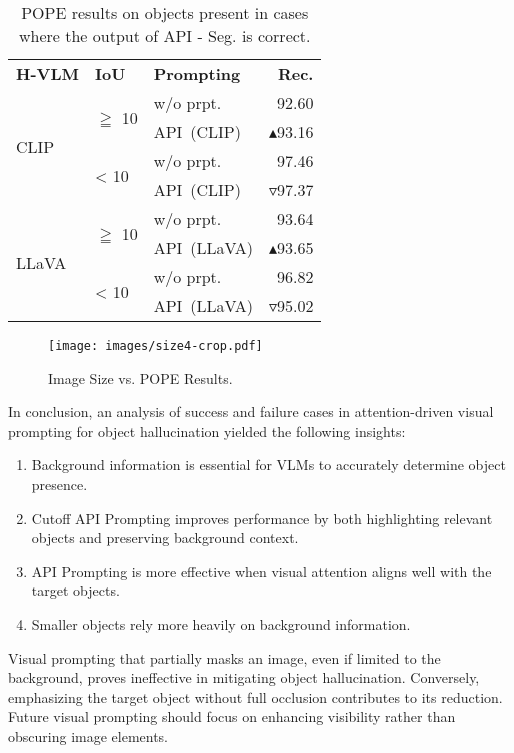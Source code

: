 \begin{table}[t!]
\centering
\begin{tabular}{lllr}
\toprule
\textbf{H-VLM} & \textbf{IoU} & \textbf{Prompting} & \textbf{Rec.} \\ \cmidrule(lr){1-4}
\multirow{4}{*}{CLIP} &\multirow{2}{*}{$\geqq$ 10} & w/o prpt. & 92.60\\
&& API~(CLIP)& \ensuremath{\blacktriangle}93.16 \\
&\multirow{2}{*}{< 10} & w/o prpt. & 97.46\\
&& API~(CLIP)& \ensuremath{\triangledown}97.37 \\
 \cmidrule(lr){1-4}
\multirow{4}{*}{LLaVA} & \multirow{2}{*}{$\geqq$ 10} & w/o prpt. & 93.64\\
&& API~(LLaVA) & \ensuremath{\blacktriangle}93.65  \\
&\multirow{2}{*}{< 10} & w/o prpt. & 96.82\\
&& API~(LLaVA) & \ensuremath{\triangledown}95.02  \\
 \bottomrule
\end{tabular}
\caption{POPE results on objects present in cases where the output of API - Seg. is correct.}
\label{table6}
\end{table}

\begin{figure}[t]
    \centering
    \texttt{[image: images/size4-crop.pdf]}
    \caption{Image Size vs. POPE Results.}
    \label{size}
\end{figure}

In conclusion, an analysis of success and failure cases in attention-driven visual prompting for object hallucination yielded the following insights:

\begin{enumerate}
\item Background information is essential for VLMs to accurately determine object presence.
\item Cutoff API Prompting improves performance by both highlighting relevant objects and preserving background context.
\item API Prompting is more effective when visual attention aligns well with the target objects.
\item Smaller objects rely more heavily on background information.
\end{enumerate}

Visual prompting that partially masks an image, even if limited to the background, proves ineffective in mitigating object hallucination. Conversely, emphasizing the target object without full occlusion contributes to its reduction. Future visual prompting should focus on enhancing visibility rather than obscuring image elements.